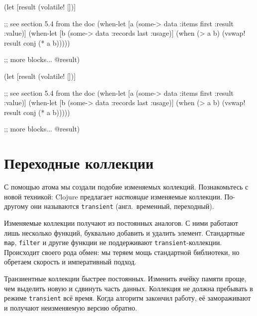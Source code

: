 \begin{english}
  \begin{clojure}
(let [result (volatile! [])]

  ;; see section 5.4 from the doc
  (when-let [a (some-> data
                       :items
                       first
                       :result
                       :value)]
    (when-let [b (some-> data
                       :records
                       last
                       :usage)]
      (when (> a b)
        (vswap! result conj (* a b)))))

  ;; more blocks...
  @result)
  \end{clojure}
\end{english}

\else

\begin{english}
  \begin{clojure}
(let [result (volatile! [])]

  ;; see section 5.4 from the doc
  (when-let [a (some-> data :items first :result :value)]
    (when-let [b (some-> data :records last :usage)]
      (when (> a b)
        (vswap! result conj (* a b)))))

  ;; more blocks...
  @result)
  \end{clojure}
\end{english}

\fi

\section{Переходные коллекции}


С помощью атома мы создали подобие изменяемых коллекций. Познакомьтесь с новой
техникой: Clojure предлагает \emph{настоящие} изменяемые коллекции. По-другому
они называются \verb|transient| (англ.~временный, переходный).

Изменяемые коллекции получают из постоянных аналогов. С ними работают лишь
несколько функций, буквально добавить и удалить элемент. Стандартные
\verb|map|, \verb|filter| и другие функции не поддерживают
\verb|transient|-коллекции. Происходит своего рода обмен: мы теряем мощь
стандартной библиотеки, но обретаем скорость и императивный подход.

Транзиентные коллекции быстрее постоянных. Изменить ячейку памяти проще, чем
выделить новую и сдвинуть часть данных. Коллекция не должна пребывать в режиме
\verb|transient| всё время. Когда алгоритм закончил работу, её
замораживают и получают неизменяемую версию обратно.

